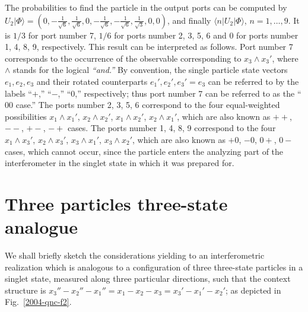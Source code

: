 \documentclass[12pt]{iopart}
\begin{document}
The probabilities to find the particle in the output ports can be computed by
$U_{2}\vert \Phi \rangle=
( 0,
-\frac{1}{{\sqrt{6}}}  ,
  \frac{1}{{\sqrt{6}}},
0,
-\frac{1}{{\sqrt{6}}}  ,
- \frac{1}{{\sqrt{6}}}  ,
  \frac{1}{{\sqrt{3}}},
0,
0)$, and finally
$\langle n \vert U_{2}\vert \Phi \rangle$, $n=1,\ldots ,9$.
It is $1/3$ for port number 7,
$1/6$ for ports number 2,  3, 5, 6
and $0$  for ports number 1, 4, 8, 9, respectively.
This result can be interpreted as follows.
Port number 7 corresponds to the occurrence of the observable corresponding to
$x_3\wedge x_3'$, where $\wedge$ stands for the logical {\em ``and.''}
By convention, the single particle state vectors
$e_1,e_2,e_3$
and their rotated counterparts
$e_1',e_2',e_3'=e_3$
can be referred to by the labels
``$+$,''
``$-$,''
``$0$,''
respectively;
thus
port number 7 can be referred to as the ``$00$ case.''
The ports number 2,  3, 5, 6 correspond to the four equal-weighted possibilities
$x_1\wedge x_1'$,
$x_2\wedge x_2'$,
$x_1\wedge x_2'$,
$x_2\wedge x_1'$,
which are also known as $++$, $--$, $+-$, $-+$ cases.
The ports number 1, 4, 8, 9 correspond to the four
$x_1\wedge x_3'$,
$x_2\wedge x_3'$,
$x_3\wedge x_1'$,
$x_3\wedge x_2'$,
which are also known as $+0$, $-0$, $0+$, $0-$ cases,
which cannot occur, since the particle enters the analyzing part
of the interferometer in the singlet state in which it was prepared for.


\section{Three particles three-state analogue}
\label{2004-analog-3p3s}

We shall briefly sketch the considerations yielding to an interferometric realization
which is analogous to a configuration of three three-state particles in a singlet state,
measured along three particular directions, such that
the context structure is $x_3''-x_2''-x_1''=x_1-x_2-x_3=x_3'-x_1'-x_2'$;
as depicted in Fig.~\ref{2004-qnc-f2}.
\end{document}
